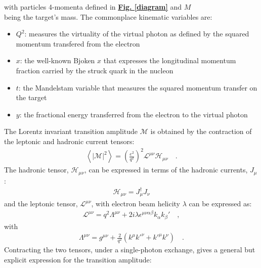 \documentclass[10pt,prd,aps,showpacs,twocolumn,unsortedaddress]{revtex4-1}
\newcommand\lr[1]{\left( #1\right) }
\newcommand\lra[1]{\left< #1\right> }
\newcommand\abv[1]{\left|#1 \right|}
\renewcommand\b[1]{{\textbf{#1}}}
\renewcommand\u[1]{{\underline{#1}}}
\newcommand\Fig[1]{\b{{\u{{Fig. #1}}}}}
\begin{document}
  with particles 4-momenta defined in \Fig{\ref{diagram}} and $M$ 
 \\ 
  being the target's mass. The commonplace kinematic variables are:
  \begin{itemize}
  \item
  $Q^2$: measures the virtuality of the virtual photon as defined by the squared momentum transfered from the electron
  \item 
  $x$: the well-known Bjoken $x$ that expresses the longitudinal momentum fraction carried by the struck quark in the nucleon
  \item
  $t$: the Mandelstam variable that measures the squared momentum transfer on the target 
  \item
  $y$: the fractional energy transferred from the electron to the virtual photon
  \end{itemize}
  
  The Lorentz invariant transition amplitude $\mathcal M$ is obtained by the contraction of the leptonic and hadronic current tensors:
  \begin{align*}
    \lra{ \abv{ \mathcal{M}}^2 } = \lr{\frac{e^2}{q^2}}^2 \mathcal L ^{\mu\nu} \mathcal H_{\mu\nu}\quad.
  \end{align*}
  The hadronic tensor, $\mathcal H_{\mu\nu}$, can be expressed in terms of the hadronic currents, $J_\mu$:
  \begin{align*}
    \mathcal H_{\mu\nu} = J^{\dagger}_\mu J_\nu 
  \end{align*}
  and the leptonic tensor, $\mathcal L^{\mu\nu}$, with electron beam helicity $\lambda$ can be expressed as:
  \begin{align*}
    \mathcal L^{\mu\nu} = q^2\Lambda^{\mu\nu} + 2i\lambda\epsilon^{\mu\nu\alpha\beta}k_\alpha k_\beta' \quad,
  \end{align*}
  with
  \begin{align*}
    \Lambda^{\mu\nu} = g^{\mu\nu} + \frac2{q^2}\lr{ k^\mu k'^\nu + k'^\mu k^\nu }\quad.
  \end{align*}
  Contracting the two tensors, under a single-photon exchange, gives a general but explicit expression for the transition amplitude:
  
\end{document}
